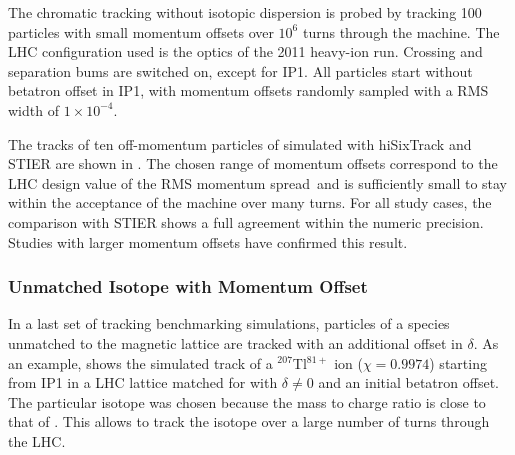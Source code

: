 



The chromatic tracking without isotopic dispersion is probed by tracking 100 particles with small momentum offsets over $10^6$ turns through the machine. The LHC configuration used is the optics of the 2011 heavy-ion run. Crossing and separation bums are switched on, except for IP1. All particles start without betatron offset in IP1, with momentum offsets randomly sampled with a RMS width of $1 \times 10^{-4}$. 

The tracks of ten off-momentum particles of \lead simulated with hiSixTrack and STIER are shown in . The chosen range of momentum offsets correspond to the LHC design value of the RMS momentum spread~\citedr and is sufficiently small to stay within the acceptance of the machine over many turns. For all study cases, the comparison with STIER shows a full agreement within the numeric precision. Studies with larger momentum offsets have confirmed this result. 






\subsubsection{Unmatched Isotope with Momentum Offset}

In a last set of tracking benchmarking simulations, particles of a species unmatched to the magnetic lattice are tracked with an additional offset in $\delta$. As an example,  shows the simulated track of a $^{207}$Tl$^{81+}$ ion ($\chi = 0.9974$) starting from IP1 in a LHC lattice matched for \lead with $\delta \neq 0$ and an initial betatron offset. The particular isotope was chosen because the mass to charge ratio is close to that of \lead. This allows to track the isotope over a large number of turns through the LHC. 


